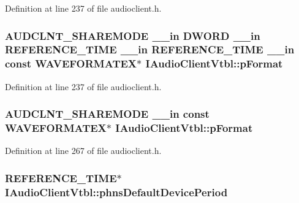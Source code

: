 Definition at line 237 of file audioclient.\+h.

\subsubsection[{\texorpdfstring{p\+Format}{pFormat}}]{ {\bf A\+U\+D\+C\+L\+N\+T\+\_\+\+S\+H\+A\+R\+E\+M\+O\+DE} {\bf \+\_\+\+\_\+in} {\bf D\+W\+O\+RD} {\bf \+\_\+\+\_\+in} {\bf R\+E\+F\+E\+R\+E\+N\+C\+E\+\_\+\+T\+I\+ME} {\bf \+\_\+\+\_\+in} {\bf R\+E\+F\+E\+R\+E\+N\+C\+E\+\_\+\+T\+I\+ME} {\bf \+\_\+\+\_\+in} {\bf const} W\+A\+V\+E\+F\+O\+R\+M\+A\+T\+EX$\ast$ I\+Audio\+Client\+Vtbl\+::p\+Format}\hypertarget{struct_i_audio_client_vtbl_aadff9c4a15c70dcb4017ac96fe7d4618}{}\label{struct_i_audio_client_vtbl_aadff9c4a15c70dcb4017ac96fe7d4618}


Definition at line 237 of file audioclient.\+h.

\subsubsection[{\texorpdfstring{p\+Format}{pFormat}}]{ {\bf A\+U\+D\+C\+L\+N\+T\+\_\+\+S\+H\+A\+R\+E\+M\+O\+DE} {\bf \+\_\+\+\_\+in} {\bf const} W\+A\+V\+E\+F\+O\+R\+M\+A\+T\+EX$\ast$ I\+Audio\+Client\+Vtbl\+::p\+Format}\hypertarget{struct_i_audio_client_vtbl_aa89752d29bff554c4b6a580362f5d6e7}{}\label{struct_i_audio_client_vtbl_aa89752d29bff554c4b6a580362f5d6e7}


Definition at line 267 of file audioclient.\+h.

\subsubsection[{\texorpdfstring{phns\+Default\+Device\+Period}{phnsDefaultDevicePeriod}}]{ {\bf R\+E\+F\+E\+R\+E\+N\+C\+E\+\_\+\+T\+I\+ME}$\ast$ I\+Audio\+Client\+Vtbl\+::phns\+Default\+Device\+Period}\hypertarget{struct_i_audio_client_vtbl_a1136677819c67c676248a7a084fd20f9}{}\label{struct_i_audio_client_vtbl_a1136677819c67c676248a7a084fd20f9}


